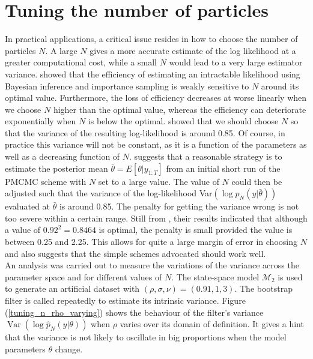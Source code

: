 \documentclass[11pt,a4,twosided,singlespacing,titlepagenumber=on]{scrreprt}
\numberwithin{equation}{chapter} %
\theoremstyle{remark}
\DeclareMathOperator{\var}{Var}
\begin{document}
\section{Tuning the number of particles}
\label{sec:tuning_n}
In practical applications, a critical issue resides in how to choose the number of particles $N$. A large $N$ gives a more accurate estimate of the log likelihood at a greater computational cost, while a small $N$ would lead to a very large estimator variance. \cite{tran2014} showed that the efficiency of estimating an intractable likelihood using Bayesian inference and importance sampling is weakly sensitive to $N$ around its optimal value. Furthermore, the loss of efficiency decreases at worse linearly when we choose $N$ higher than the optimal value, whereas
the efficiency can deteriorate exponentially when $N$ is below the optimal. \cite{pitt2012} showed that we should choose $N$ so that the variance of the resulting log-likelihood is around 0.85. Of course, in practice this variance will not be constant, as it is a function of the parameters as well as a decreasing function of $N$. \cite{pitt2012} suggests that a reasonable strategy is to estimate the posterior mean $\bar{\theta} = E[\theta|y_{1:T}]$ from an initial short run of the PMCMC scheme with $N$ set to a large value. The value of $N$ could then be adjusted such that the variance of the log-likelihood Var$(\log p_N(y|\bar{\theta}))$ evaluated at $\bar{\theta}$ is around 0.85. The penalty for getting the variance wrong is not too severe within a certain range. Still from \cite{pitt2012}, their results indicated that although a value of $0.92^2 = 0.8464$ is optimal, the penalty is small provided the value is between 0.25 and 2.25. This allows for quite a large margin of error in choosing $N$ and also suggests that the simple schemes advocated should work well. \\
An analysis was carried out to measure the variations of the variance across the parameter space and for different values of $N$. The state-space model $\mathcal{M}_2$ is used to generate an artificial dataset with $(\rho,\sigma,\nu) = (0.91,1,3)$. The bootstrap filter is called repeatedly to estimate its intrinsic variance. Figure (\ref{tuning_n_rho_varying}) shows the behaviour of the filter's variance $\var(\log \hat{p}_N(y|\theta))$ when $\rho$ varies over its domain of definition. It gives a hint that the variance is not likely to oscillate in big proportions when the model parameters $\theta$ change. \\
\end{document}
